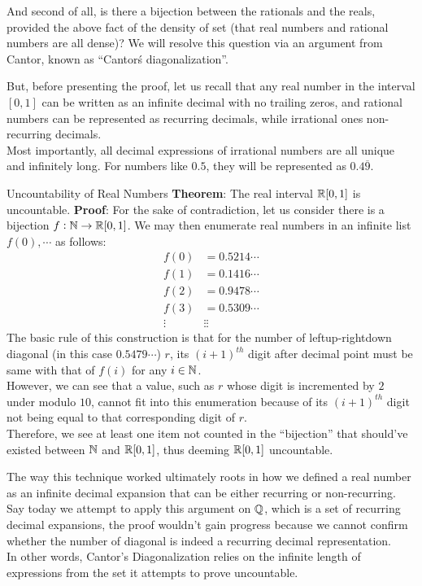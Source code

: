 And second of all, is there a bijection between the rationals and the reals, provided the above fact of the density of set (that real numbers and rational numbers are all dense)? We will resolve this question via an argument from Cantor, known as ``Cantor\'s diagonalization''.

But, before presenting the proof, let us recall that any real number in the interval $[0, 1]$ can be written as an infinite decimal with no trailing zeros, and rational numbers can be represented as recurring decimals, while irrational ones non-recurring decimals. \\
Most importantly, all decimal expressions of irrational numbers are all unique and infinitely long. For numbers like $0.5$, they will be represented as $0.4\overline{9}$.
\begin{ln-theorem}{Uncountability of Real Numbers}{}
    \textbf{Theorem}: The real interval $\mathbb{R}[0, 1]$ is uncountable.
    \tcblower
    \textbf{Proof}: For the sake of contradiction, let us consider there is a bijection $f: \mathbb{N} \rightarrow \mathbb{R}[0, 1]$. We may then enumerate real numbers in an infinite list $f(0), \cdots$ as follows:
    \begin{align*}
        f(0) &= 0.5214\cdots \\
        f(1) &= 0.1416\cdots \\
        f(2) &= 0.9478\cdots \\
        f(3) &= 0.5309\cdots \\
        \vdots &\vdots \vdots
    \end{align*}
    The basic rule of this construction is that for the number of leftup-rightdown diagonal (in this case $0.5479\cdots$) $r$, its ${(i + 1)}^{th}$ digit after decimal point must be same with that of $f(i)$ for any $i \in \mathbb{N}$. \\
    However, we can see that a value, such as $r$ whose digit is incremented by $2$ under modulo $10$, cannot fit into this enumeration because of its ${(i + 1)}^{th}$ digit not being equal to that corresponding digit of $r$. \\
    Therefore, we see at least one item not counted in the ``bijection'' that should've existed between $\mathbb{N}$ and $\mathbb{R}[0, 1]$, thus deeming $\mathbb{R}[0, 1]$ uncountable.
\end{ln-theorem}
The way this technique worked ultimately roots in how we defined a real number as an infinite decimal expansion that can be either recurring or non-recurring. Say today we attempt to apply this argument on $\mathbb{Q}$, which is a set of recurring decimal expansions, the proof wouldn't gain progress because we cannot confirm whether the number of diagonal is indeed a recurring decimal representation. \\
In other words, Cantor's Diagonalization relies on the infinite length of expressions from the set it attempts to prove uncountable.

